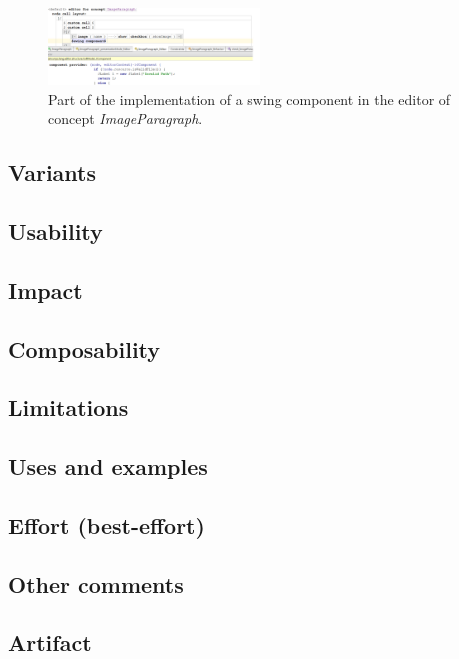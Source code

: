 \documentclass[preprint,numbers,10pt]{sigplanconf}
\begin{document}
\begin{figure}[H]
	\centering
	\includegraphics[width=0.50\textwidth]{screens/EditorImageParagraph.png}
	\caption{Part of the implementation of a swing component in the editor of concept \emph{ImageParagraph}.}
	\label{fig:EditorImageParagraph}
\end{figure}
\subsection{Variants}

\subsection{Usability}

\subsection{Impact}

\subsection{Composability}

\subsection{Limitations}

\subsection{Uses and examples}

\subsection{Effort (best-effort)}

\subsection{Other comments}

\subsection{Artifact}
\end{document}
